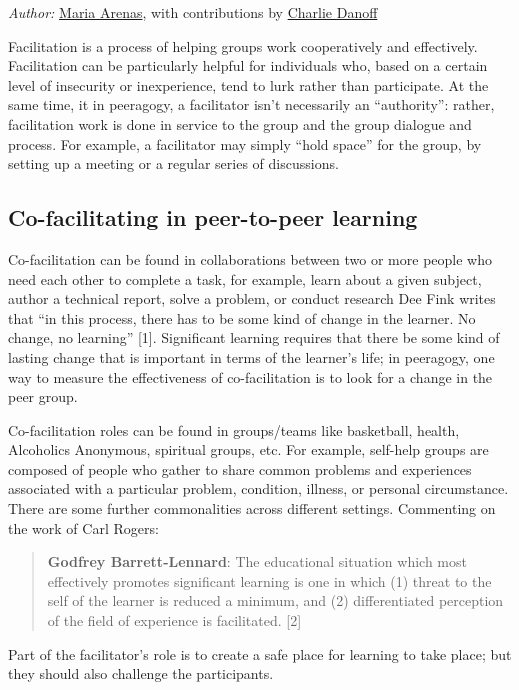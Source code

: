 \emph{Author:}
\href{http://peeragogy.org/resources/meet-the-team/}{Maria Arenas}, with
contributions by
\href{http://peeragogy.org/resources/meet-the-team/}{Charlie Danoff}

Facilitation is a process of helping groups work cooperatively and
effectively. Facilitation can be particularly helpful for individuals
who, based on a certain level of insecurity or inexperience, tend to
lurk rather than participate. At the same time, it in peeragogy, a
facilitator isn't necessarily an ``authority'': rather, facilitation
work is done in service to the group and the group dialogue and process.
For example, a facilitator may simply ``hold space'' for the group, by
setting up a meeting or a regular series of discussions.

\subsection{Co-facilitating in peer-to-peer learning}

Co-facilitation can be found in collaborations between two or more
people who need each other to complete a task, for example, learn about
a given subject, author a technical report, solve a problem, or conduct
research Dee Fink writes that ``in this process, there has to be some
kind of change in the learner. No change, no learning'' {[}1{]}.
Significant learning requires that there be some kind of lasting change
that is important in terms of the learner's life; in peeragogy, one way
to measure the effectiveness of co-facilitation is to look for a change
in the peer group.

Co-facilitation roles can be found in groups/teams like basketball,
health, Alcoholics Anonymous, spiritual groups, etc. For example,
self-help groups are composed of people who gather to share common
problems and experiences associated with a particular problem,
condition, illness, or personal circumstance. There are some further
commonalities across different settings. Commenting on the work of Carl
Rogers:

\begin{quote}
\textbf{Godfrey Barrett-Lennard}: The educational situation which most
effectively promotes significant learning is one in which (1) threat to
the self of the learner is reduced a minimum, and (2) differentiated
perception of the field of experience is facilitated. {[}2{]}

\end{quote}
Part of the facilitator's role is to create a safe place for learning to
take place; but they should also challenge the participants.

